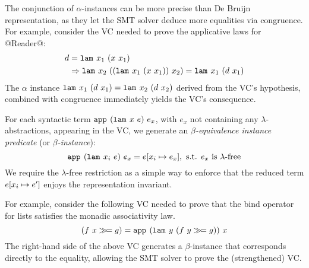 %

The conjunction of $\alpha$-instances
can be more precise than De Bruijn
representation, as they let the SMT
solver deduce more equalities via
congruence.
%
For example, consider the VC needed
to prove the applicative laws for @Reader@:
%
\begin{align*}
d & = \texttt{lam}^{}_{}\ {x_1}\ {({x}\ {x_1})} \\
  & \Rightarrow \texttt{lam}^{}_{}\ {x_2}\ {({(\texttt{lam}^{}_{}\ {x_1}\ {({x}\ {x_1})})}\ {x_2})}
              = \texttt{lam}^{}_{}\ {x_1}\ {({d}\ {x_1})}
\end{align*}
%
The $\alpha$ instance
%
${\texttt{lam}^{}_{}\ {x_1}\ {({d}\ {x_1})} = \texttt{lam}^{}_{}\ {x_2}\ {({d}\ {x_2})}}$
%
derived from the VC's hypothesis,
combined with congruence immediately
yields the VC's consequence.

%
For each syntactic term $\texttt{app}^{}_{}\ {(\texttt{lam}^{}_{}\ {x}\ {e})}\ {e_x}$,
with $e_x$ not containing any $\lambda$-abstractions,
appearing in the VC,
we generate an \emph{$\beta$-equivalence instance predicate}
(or \emph{$\beta$-instance}):
$$
\texttt{app}^{}_{}\ {(\texttt{lam}^{}_{}\ {x_i}\ {e})}\ {e_x} = {e}[{{x_i} \mapsto {e_x}}],
  \mbox{ s.t. } e_x \mbox{ is $\lambda$-free}
$$
%
We require the $\lambda$-free restriction as
a simple way to enforce that the reduced
term ${{e}[{{x_i} \mapsto {e'}}]}$ enjoys the
representation invariant.
%

For example, consider the following VC
needed to prove that the bind operator for
lists satisfies the monadic associativity law.
%
$$({f}\ {x} \gg\!= g) = \texttt{app}^{}_{}\ {(\texttt{lam}^{}_{}\ {y}\ {({f}\ {y} \gg\!= g)})}\ {x}$$
%
The right-hand side of the above VC generates
a $\beta$-instance that corresponds directly
to the equality, allowing the SMT solver to
prove the (strengthened) VC.


